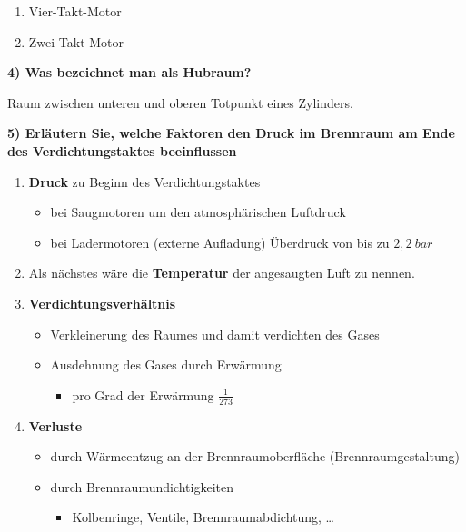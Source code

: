 \begin{enumerate}
\def\labelenumi{(\arabic{enumi})}
\item
  Vier-Takt-Motor
\item
  Zwei-Takt-Motor
\end{enumerate}

\textbf{4) Was bezeichnet man als Hubraum?}

Raum zwischen unteren und oberen Totpunkt eines Zylinders.

\textbf{5) Erläutern Sie, welche Faktoren den Druck im Brennraum am Ende
des Verdichtungstaktes beeinflussen}

\begin{enumerate}
\def\labelenumi{(\arabic{enumi})}
\item
  \textbf{Druck} zu Beginn des Verdichtungstaktes

  \begin{itemize}
  \item
    bei Saugmotoren um den atmosphärischen Luftdruck
  \item
    bei Ladermotoren (externe Aufladung) Überdruck von bis zu
    $2,2~bar$
  \end{itemize}
\item
  Als nächstes wäre die \textbf{Temperatur} der angesaugten Luft zu
  nennen.
\item
  \textbf{Verdichtungsverhältnis}

  \begin{itemize}
  \item
    Verkleinerung des Raumes und damit verdichten des Gases
  \item
    Ausdehnung des Gases durch Erwärmung

    \begin{itemize}
    \item
      pro Grad der Erwärmung $\frac{1}{273}$
    \end{itemize}
  \end{itemize}
\item
  \textbf{Verluste}

  \begin{itemize}
  \item
    durch Wärmeentzug an der Brennraumoberfläche (Brennraumgestaltung)
  \item
    durch Brennraumundichtigkeiten

    \begin{itemize}
    \item
      Kolbenringe, Ventile, Brennraumabdichtung, \ldots{}
    \end{itemize}
  \end{itemize}
\end{enumerate}

